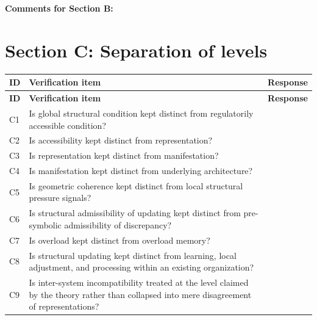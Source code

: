 \documentclass[11pt,a4paper]{article}
\begin{document}
	\textbf{Comments for Section B:}
	
	\vspace{3em}
	
	\section{Section C: Separation of levels}
	
	\begin{longtable}{>{\RaggedRight\arraybackslash}p{}
			>{\RaggedRight\arraybackslash}p{}
			>{\RaggedRight\arraybackslash}p{}}
		\toprule
		\textbf{ID} & \textbf{Verification item} & \textbf{Response} \\
		\midrule
		\endfirsthead
		\toprule
		\textbf{ID} & \textbf{Verification item} & \textbf{Response} \\
		\midrule
		\endhead
		
		C1 & Is global structural condition kept distinct from regulatorily accessible condition? & \\
		
		C2 & Is accessibility kept distinct from representation? & \\
		
		C3 & Is representation kept distinct from manifestation? & \\
		
		C4 & Is manifestation kept distinct from underlying architecture? & \\
		
		C5 & Is geometric coherence kept distinct from local structural pressure signals? & \\
		
		C6 & Is structural admissibility of updating kept distinct from pre-symbolic admissibility of discrepancy? & \\
		
		C7 & Is overload kept distinct from overload memory? & \\
		
		C8 & Is structural updating kept distinct from learning, local adjustment, and processing within an existing organization? & \\
		
		C9 & Is inter-system incompatibility treated at the level claimed by the theory rather than collapsed into mere disagreement of representations? & \\
		
		\bottomrule
	\end{longtable}
	
\end{document}
